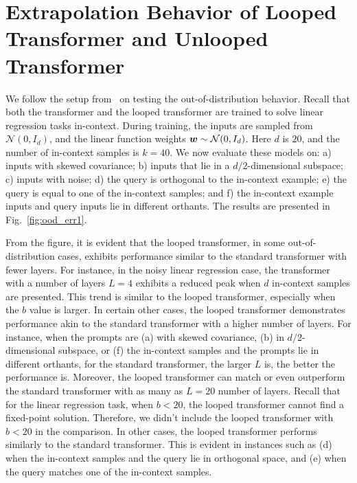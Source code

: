 \documentclass{article} %
\theoremstyle{plain}
\theoremstyle{definition}
\theoremstyle{remark}
\begin{document}
\section{Extrapolation Behavior of Looped Transformer and Unlooped Transformer}\label{sec:extrapolation}
We follow the setup from~\citet{Garg2022WhatCT} on testing the out-of-distribution behavior. Recall that both the transformer and the looped transformer are trained to solve linear regression tasks in-context. During training, the inputs are sampled from $\mathcal{N}(0, I_d)$, and the linear function weights ${\bm{w}}\sim\mathcal{N}(0, I_d)$. Here $d$ is $20$, and the number of in-context samples is $k=40$. We now evaluate these models on:
a) inputs with skewed covariance; b) inputs that lie in a $d/2$-dimensional subspace; c) inputs with noise; d) the query is orthogonal to the in-context example; e) the query is equal to one of the in-context samples; and f) the in-context example inputs and query inputs lie in different orthants. The results are presented in Fig.~\ref{fig:ood_err1}.

From the figure, it is evident that the looped transformer, in some out-of-distribution cases, exhibits performance similar to the standard transformer with fewer layers. For instance, in the noisy linear regression case, the transformer with a number of layers $L=4$ exhibits a reduced peak when $d$ in-context samples are presented. This trend is similar to the looped transformer, especially when the $b$ value is larger. In certain other cases, the looped transformer demonstrates performance akin to the standard transformer with a higher number of layers. For instance, when the prompts are (a) with skewed covariance, (b) in $d/2$-dimensional subspace, or (f) the in-context samples and the prompts lie in different orthants, for the standard transformer, the larger $L$ is, the better the performance is. Moreover, the looped transformer can match or even outperform the standard transformer with as many as $L=20$ number of layers. Recall that for the linear regression task, when $b<20$, the looped transformer cannot find a fixed-point solution. Therefore, we didn't include the looped transformer with $b<20$ in the comparison. In other cases, the looped transformer performs similarly to the standard transformer. This is evident in instances such as (d) when the in-context samples and the query lie in orthogonal space, and (e) when the query matches one of the in-context samples.
\end{document}
